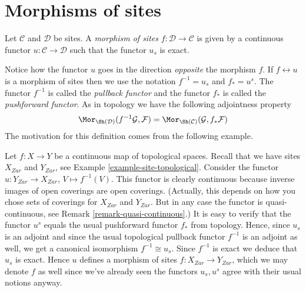 \section{Morphisms of sites}
\label{section-morphism-sites}

\begin{definition}
\label{definition-morphism-sites}
Let $\mathcal{C}$ and $\mathcal{D}$ be sites.
A {\it morphism of sites} $f : \mathcal{D} \to \mathcal{C}$
is given by a continuous functor $u : \mathcal{C} \to \mathcal{D}$
such that the functor $u_s$ is exact.
\end{definition}

\noindent
Notice how the functor $u$ goes in the direction {\it opposite}
the morphism $f$. If $f \leftrightarrow u$ is a morphism of sites
then we use the notation $f^{-1} = u_s$ and $f_* = u^s$.
The functor $f^{-1}$ is called the {\it pullback functor} and
the functor $f_*$ is called the {\it pushforward functor}.
As in topology we have the following adjointness property
$$
\Mor_{\Sh(\mathcal{D})}(f^{-1}\mathcal{G}, \mathcal{F})
=
\Mor_{\Sh(\mathcal{C})}(\mathcal{G}, f_*\mathcal{F})
$$
The motivation for this definition comes from the following
example.

\begin{example}
\label{example-continuous-map}
Let $f : X  \to Y$ be a continuous map of topological spaces.
Recall that we have sites $X_{Zar}$ and $Y_{Zar}$,
see Example \ref{example-site-topological}. Consider the functor
$u : Y_{Zar} \to X_{Zar}$, $V \mapsto f^{-1}(V)$.
This functor is clearly continuous because inverse images of
open coverings are open coverings. (Actually, this depends on how
you chose sets of coverings for $X_{Zar}$ and $Y_{Zar}$.
But in any case the functor is quasi-continuous, see Remark
\ref{remark-quasi-continuous}.)
It is easy to verify that
the functor $u^s$ equals the usual pushforward functor $f_*$
from topology. Hence, since $u_s$ is an adjoint and since
the usual topological pullback functor $f^{-1}$ is an adjoint as well,
we get a canonical isomorphism $f^{-1} \cong u_s$. Since $f^{-1}$
is exact we deduce that $u_s$ is exact. Hence $u$ defines a morphism
of sites $f : X_{Zar} \to Y_{Zar}$, which we may denote
$f$ as well since we've already seen the functors $u_s, u^s$ agree
with their usual notions anyway.
\end{example}

